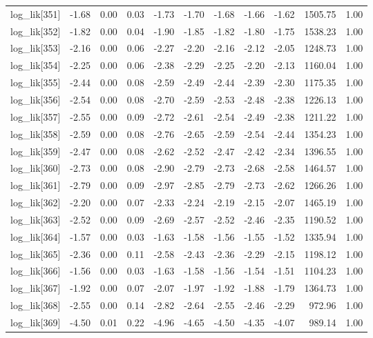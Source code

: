 \begin{table}[ht]
\begin{tabular}{rrrrrrrrrrr}
  log\_lik[351] & -1.68 & 0.00 & 0.03 & -1.73 & -1.70 & -1.68 & -1.66 & -1.62 & 1505.75 & 1.00 \\ 
  log\_lik[352] & -1.82 & 0.00 & 0.04 & -1.90 & -1.85 & -1.82 & -1.80 & -1.75 & 1538.23 & 1.00 \\ 
  log\_lik[353] & -2.16 & 0.00 & 0.06 & -2.27 & -2.20 & -2.16 & -2.12 & -2.05 & 1248.73 & 1.00 \\ 
  log\_lik[354] & -2.25 & 0.00 & 0.06 & -2.38 & -2.29 & -2.25 & -2.20 & -2.13 & 1160.04 & 1.00 \\ 
  log\_lik[355] & -2.44 & 0.00 & 0.08 & -2.59 & -2.49 & -2.44 & -2.39 & -2.30 & 1175.35 & 1.00 \\ 
  log\_lik[356] & -2.54 & 0.00 & 0.08 & -2.70 & -2.59 & -2.53 & -2.48 & -2.38 & 1226.13 & 1.00 \\ 
  log\_lik[357] & -2.55 & 0.00 & 0.09 & -2.72 & -2.61 & -2.54 & -2.49 & -2.38 & 1211.22 & 1.00 \\ 
  log\_lik[358] & -2.59 & 0.00 & 0.08 & -2.76 & -2.65 & -2.59 & -2.54 & -2.44 & 1354.23 & 1.00 \\ 
  log\_lik[359] & -2.47 & 0.00 & 0.08 & -2.62 & -2.52 & -2.47 & -2.42 & -2.34 & 1396.55 & 1.00 \\ 
  log\_lik[360] & -2.73 & 0.00 & 0.08 & -2.90 & -2.79 & -2.73 & -2.68 & -2.58 & 1464.57 & 1.00 \\ 
  log\_lik[361] & -2.79 & 0.00 & 0.09 & -2.97 & -2.85 & -2.79 & -2.73 & -2.62 & 1266.26 & 1.00 \\ 
  log\_lik[362] & -2.20 & 0.00 & 0.07 & -2.33 & -2.24 & -2.19 & -2.15 & -2.07 & 1465.19 & 1.00 \\ 
  log\_lik[363] & -2.52 & 0.00 & 0.09 & -2.69 & -2.57 & -2.52 & -2.46 & -2.35 & 1190.52 & 1.00 \\ 
  log\_lik[364] & -1.57 & 0.00 & 0.03 & -1.63 & -1.58 & -1.56 & -1.55 & -1.52 & 1335.94 & 1.00 \\ 
  log\_lik[365] & -2.36 & 0.00 & 0.11 & -2.58 & -2.43 & -2.36 & -2.29 & -2.15 & 1198.12 & 1.00 \\ 
  log\_lik[366] & -1.56 & 0.00 & 0.03 & -1.63 & -1.58 & -1.56 & -1.54 & -1.51 & 1104.23 & 1.00 \\ 
  log\_lik[367] & -1.92 & 0.00 & 0.07 & -2.07 & -1.97 & -1.92 & -1.88 & -1.79 & 1364.73 & 1.00 \\ 
  log\_lik[368] & -2.55 & 0.00 & 0.14 & -2.82 & -2.64 & -2.55 & -2.46 & -2.29 & 972.96 & 1.00 \\ 
  log\_lik[369] & -4.50 & 0.01 & 0.22 & -4.96 & -4.65 & -4.50 & -4.35 & -4.07 & 989.14 & 1.00 \\ 

\end{tabular}
\end{table}
